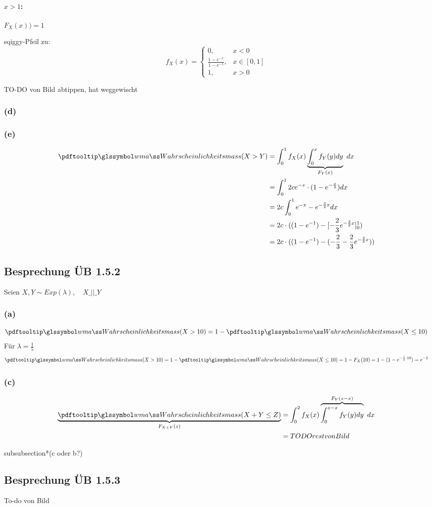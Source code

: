\paragraph{$x>1$:} $F_X(x)) = 1$

sqiggy-Pfeil zu:
\[
    f_X(x) = \begin{cases}
                 0, & x<0 \\
                 \frac{1-e^{-x}}{1-e^{-1}}, & x \in [0,1] \\
                 1, & x>0
    \end{cases}
\]


TO-DO von Bild abtippen, hat weggewischt %

\subsubsection*{(d)}

\subsubsection*{(e)}

\begin{align*}
    \pe(X > Y) &= \int_0^1 f_X(x) \underbrace{ \int_0^x f_Y(y) dy}_{F_Y(x)} \ dx  \\
    &= \int_0^{1} 2c e^{-x} \cdot (1-e^{-\frac{x}{2}}) dx \\
    & = 2c \int_0^1 e^{-x} - e^{-\frac{3}{2}x} dx \\
    & = 2c \cdot ( (1-e^{-1}) - [-\frac{2}{3} e^{-\frac{3}{2}x} ]^1_0) \\
    & = 2c \cdot ( (1-e^{-1}) - (- \frac{2}{3} - \frac{2}{3} e^{-\frac{3}{2}x}))
\end{align*}

\subsection{Besprechung ÜB 1.5.2}\label{sec:besprechung-ub-1.5.2}
Seien $X,Y \sim Exp(\lambda), \quad X \_||\_ Y$
\subsubsection*{(a)}
\[
    \pe(X> 10) = 1 - \pe(X \leq 10)
\]
Für $\lambda = \frac{1}{5}$
\[
    \pe(X> 10) = 1 - \pe(X \leq 10) = 1-F_X(10) = 1 - (1-e^{-\frac{1}{5} \cdot 10}) = e^{-2}
\]
\subsubsection*{(c)}

\begin{align*}
    \underbrace{\pe(X+Y \leq Z )}_{F_{X+Y}(z)} & = \int_0^2 f_X(x) \overbrace{\int_0^{z-x} f_Y(y) dy}^{F_Y(z-x)} \ dx \\
    &=  TODO rest von Bild %
\end{align*}

subsubsection*{(c oder b?)}

\subsection{Besprechung ÜB 1.5.3}\label{sec:besprechung-ub-1.5.3}
To-do von Bild %